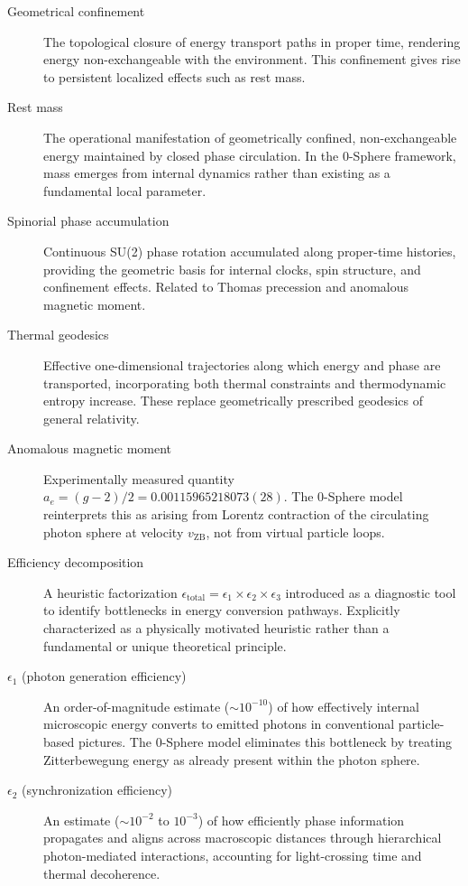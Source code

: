 \documentclass[12pt,letterpaper]{article}
\begin{document}
\begin{description}
\item[Geometrical confinement] The topological closure of energy transport paths in proper time, rendering energy non-exchangeable with the environment. This confinement gives rise to persistent localized effects such as rest mass.

\item[Rest mass] The operational manifestation of geometrically confined, non-exchangeable energy maintained by closed phase circulation. In the 0-Sphere framework, mass emerges from internal dynamics rather than existing as a fundamental local parameter.

\item[Spinorial phase accumulation] Continuous SU(2) phase rotation accumulated along proper-time histories, providing the geometric basis for internal clocks, spin structure, and confinement effects. Related to Thomas precession and anomalous magnetic moment.

\item[Thermal geodesics] Effective one-dimensional trajectories along which energy and phase are transported, incorporating both thermal constraints and thermodynamic entropy increase. These replace geometrically prescribed geodesics of general relativity.

\item[Anomalous magnetic moment] Experimentally measured quantity $a_e = (g-2)/2 = 0.00115965218073(28)$. The 0-Sphere model reinterprets this as arising from Lorentz contraction of the circulating photon sphere at velocity $v_{\mathrm{ZB}}$, not from virtual particle loops.

\item[Efficiency decomposition] A heuristic factorization $\epsilon_{\text{total}} = \epsilon_1 \times \epsilon_2 \times \epsilon_3$ introduced as a diagnostic tool to identify bottlenecks in energy conversion pathways. Explicitly characterized as a physically motivated heuristic rather than a fundamental or unique theoretical principle.

\item[$\epsilon_1$ (photon generation efficiency)] An order-of-magnitude estimate ($\sim 10^{-10}$) of how effectively internal microscopic energy converts to emitted photons in conventional particle-based pictures. The 0-Sphere model eliminates this bottleneck by treating Zitterbewegung energy as already present within the photon sphere.

\item[$\epsilon_2$ (synchronization efficiency)] An estimate ($\sim 10^{-2}$ to $10^{-3}$) of how efficiently phase information propagates and aligns across macroscopic distances through hierarchical photon-mediated interactions, accounting for light-crossing time and thermal decoherence.


\end{description}
\end{document}
